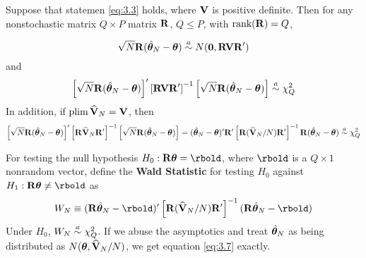 \documentclass[11pt, oneside, a4paper, article]{article}
\numberwithin{equation}{section}
\begin{document}
\begin{lem} 
Suppose that statemen \eqref{eq:3.3} holds, where $\mathbf{V}$ is positive definite.
Then for any nonstochastic matrix $Q \times P$ matrix $\mathbf{R}$, $Q \leq P$, with $\text{rank}(\mathbf{R}) = Q$,

\begin{equation*}
	\sqrt{N} \mathbf{R} (\hat{\boldsymbol{\theta}}_{N} - \boldsymbol{\theta})  \overset{a}{\sim}  N(\boldsymbol{0}, \mathbf{R} \mathbf{V} \mathbf{R}')
\end{equation*}
and
\begin{equation*}
	\left[ \sqrt{N} \mathbf{R} (\hat{\boldsymbol{\theta}}_{N} - \boldsymbol{\theta}) \right]'
	\left[ \mathbf{R} \mathbf{V} \mathbf{R}'  \right]^{-1}
	\left[ \sqrt{N} \mathbf{R} (\hat{\boldsymbol{\theta}}_{N} - \boldsymbol{\theta}) \right]
	 \overset{a}{\sim}  \chi^{2}_{Q}
\end{equation*}
In addition, if $\text{plim} \, \widehat{\mathbf{V}}_{N} = \mathbf{V}$, then
\begin{equation*}
	\left[ \sqrt{N} \mathbf{R} (\hat{\boldsymbol{\theta}}_{N} - \boldsymbol{\theta}) \right]'
	\left[ \mathbf{R} \widehat{\mathbf{V}}_{N} \mathbf{R}'  \right]^{-1}
	\left[ \sqrt{N} \mathbf{R} (\hat{\boldsymbol{\theta}}_{N} - \boldsymbol{\theta}) \right]
	=
	(\hat{\boldsymbol{\theta}}_{N} - \boldsymbol{\theta})' \mathbf{R} '
	\left[ \mathbf{R} ( \widehat{\mathbf{V}}_{N}/N ) \mathbf{R}'  \right]^{-1}
	\mathbf{R} (\hat{\boldsymbol{\theta}}_{N} - \boldsymbol{\theta})
	 \overset{a}{\sim}  \chi^{2}_{Q}
\end{equation*}
\end{lem}
\begin{remark}
For testing the null hypothesis $H_{0}: \Rbold \thetabold = \rbold$, 
where $\rbold$ is a $Q \times 1$ nonrandom vector, define the \textbf{Wald Statistic} for testing $H_{0}$ against $H_{1}: \Rbold \thetabold \neq \rbold $ as
\begin{equation}\label{eq:3.7}
	W_{N} \equiv
	(\Rbold \thetahatbold_{N} - \rbold)'
	\left[ \Rbold ( \Vhatbold_{N}/N ) \Rbold'  \right]^{-1}
	(\Rbold \thetahatbold_{N} - \rbold)
\end{equation}
Under $H_{0}$, $W_{N}  \overset{a}{\sim}  \chi^{2}_{Q}$. If we abuse the asymptotics and treat $\hat{\boldsymbol{\theta}}_{N}$ as being distributed as $N(\boldsymbol{\theta}, \widehat{\mathbf{V}}_{N}/N)$, we get equation \eqref{eq:3.7} exactly.
\end{remark}
\end{document}
